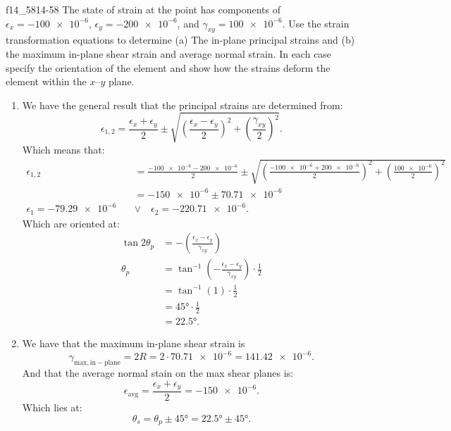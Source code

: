 \begin{problemwithimage}{f14_58}{14-58}
  The state of strain at the point has components of $\epsilon_x = \num{-100e-6}$, $\epsilon_y = \num{-200e-6}$, and $\gamma_{xy} = \num{100e-6}$.
  Use the strain transformation equations to determine (a) The in-plane principal strains and (b) the maximum in-plane shear strain and average normal strain.
  In each case specify the orientation of the element and show how the strains deform the element within the $x$--$y$ plane.
\end{problemwithimage}

\begin{derivation}
  \begin{enumerate}[label=(\alph*)]
    \item We have the general result that the principal strains are determined from:
      \begin{equation*}
        \epsilon_{1,2} = \frac{\epsilon_x + \epsilon_y}{2} \pm \sqrt{\left( \frac{\epsilon_x - \epsilon_y}{2} \right)^2 + \left( \frac{\gamma_{xy}}{2} \right)^2}
      .\end{equation*}
      Which means that:
      \begin{align*}
      \epsilon_{1,2} &= \frac{\num{-100e-6} - \num{200e-6}}{2} \pm \sqrt{\left( \frac{\num{-100e-6} + \num{200e-6} }{2} \right)^2 + \left( \frac{\num{100e-6} }{2} \right)^2} \\
      &= \num{-150e-6} \pm \num{70,71e-6}  \\
      \epsilon_1 = \num{-79,29e-6} \quad &\vee \quad \epsilon_2 = \num{-220,71e-6} 
      .\end{align*}
      Which are oriented at:
      \begin{align*}
        \tan 2 \theta_p &= - \left( \frac{\epsilon_x - \epsilon_y}{\gamma_{xy}} \right) \\
        \theta_p &= \tan^{-1} \left( - \frac{\epsilon_x - \epsilon_y}{\gamma_{xy}} \right) \cdot \frac{1}{2} \\
        &= \tan^{-1} (1) \cdot \frac{1}{2} \\
        &= \ang{45} \cdot \frac{1}{2} \\
        &= \ang{22,5} 
      .\end{align*}
    \item We have that the maximum in-plane shear strain is
      \begin{equation*}
        \gamma_{\mathrm{max}, \mathrm{in-plane}} = 2 R = 2 \cdot \num{70,71e-6} = \num{141,42e-6}  
      .\end{equation*}
      And that the average normal stain on the max shear planes is:
      \begin{equation*}
        \epsilon_{\mathrm{avg}} = \frac{\epsilon_x + \epsilon_y}{2} = \num{-150e-6} 
      .\end{equation*}
      Which lies at:
      \begin{equation*}
        \theta_s = \theta_p \pm \ang{45}  = \ang{22,5} \pm \ang{45} 
      .\end{equation*}
  \end{enumerate}
\end{derivation}

